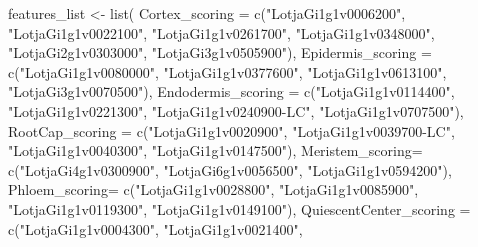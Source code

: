 \documentclass[
  letterpaper,
  DIV=11,
  numbers=noendperiod]{scrartcl}
\newenvironment{Shaded}{\begin{snugshade}}{\end{snugshade}}
\newcommand{\FunctionTok}[1]{\textcolor[rgb]{0.02,0.16,0.49}{#1}}
\newcommand{\NormalTok}[1]{\textcolor[rgb]{0.00,0.44,0.13}{#1}}
\newcommand{\OtherTok}[1]{\textcolor[rgb]{0.00,0.44,0.13}{#1}}
\newcommand{\StringTok}[1]{\textcolor[rgb]{0.25,0.44,0.63}{#1}}
\begin{document}
\begin{Shaded}
\begin{Highlighting}[]
\NormalTok{features\_list }\OtherTok{\textless{}{-}} \FunctionTok{list}\NormalTok{(}
    \StringTok{\textquotesingle{}Cortex\_scoring\textquotesingle{}} \OtherTok{=} \FunctionTok{c}\NormalTok{(}\StringTok{"LotjaGi1g1v0006200"}\NormalTok{,}
                 \StringTok{"LotjaGi1g1v0022100"}\NormalTok{,}
                 \StringTok{"LotjaGi1g1v0261700"}\NormalTok{,}
                 \StringTok{"LotjaGi1g1v0348000"}\NormalTok{,}
                 \StringTok{"LotjaGi2g1v0303000"}\NormalTok{,}
                 \StringTok{"LotjaGi3g1v0505900"}\NormalTok{),}
    \StringTok{\textquotesingle{}Epidermis\_scoring\textquotesingle{}} \OtherTok{=} \FunctionTok{c}\NormalTok{(}\StringTok{"LotjaGi1g1v0080000"}\NormalTok{,}
                    \StringTok{"LotjaGi1g1v0377600"}\NormalTok{,}
                    \StringTok{"LotjaGi1g1v0613100"}\NormalTok{,}
                    \StringTok{"LotjaGi3g1v0070500"}\NormalTok{),}
    \StringTok{\textquotesingle{}Endodermis\_scoring\textquotesingle{}} \OtherTok{=} \FunctionTok{c}\NormalTok{(}\StringTok{"LotjaGi1g1v0114400"}\NormalTok{,}
                     \StringTok{"LotjaGi1g1v0221300"}\NormalTok{,}
                     \StringTok{"LotjaGi1g1v0240900{-}LC"}\NormalTok{,}
                     \StringTok{"LotjaGi1g1v0707500"}\NormalTok{), }
    \StringTok{\textquotesingle{}RootCap\_scoring\textquotesingle{}} \OtherTok{=} \FunctionTok{c}\NormalTok{(}\StringTok{"LotjaGi1g1v0020900"}\NormalTok{,}
                   \StringTok{"LotjaGi1g1v0039700{-}LC"}\NormalTok{,}
                   \StringTok{"LotjaGi1g1v0040300"}\NormalTok{,}
                   \StringTok{"LotjaGi1g1v0147500"}\NormalTok{),  }
    \StringTok{\textquotesingle{}Meristem\_scoring\textquotesingle{}}\OtherTok{=} \FunctionTok{c}\NormalTok{(}\StringTok{"LotjaGi4g1v0300900"}\NormalTok{,}
                         \StringTok{"LotjaGi6g1v0056500"}\NormalTok{,}
                         \StringTok{"LotjaGi1g1v0594200"}\NormalTok{),}
    \StringTok{\textquotesingle{}Phloem\_scoring\textquotesingle{}}\OtherTok{=} \FunctionTok{c}\NormalTok{(}\StringTok{"LotjaGi1g1v0028800"}\NormalTok{,}
                \StringTok{"LotjaGi1g1v0085900"}\NormalTok{,}
                \StringTok{"LotjaGi1g1v0119300"}\NormalTok{,}
                \StringTok{"LotjaGi1g1v0149100"}\NormalTok{),}
    \StringTok{\textquotesingle{}QuiescentCenter\_scoring\textquotesingle{}} \OtherTok{=} \FunctionTok{c}\NormalTok{(}\StringTok{"LotjaGi1g1v0004300"}\NormalTok{,}
                           \StringTok{"LotjaGi1g1v0021400"}\NormalTok{,}

\end{Highlighting}
\end{Shaded}
\end{document}
